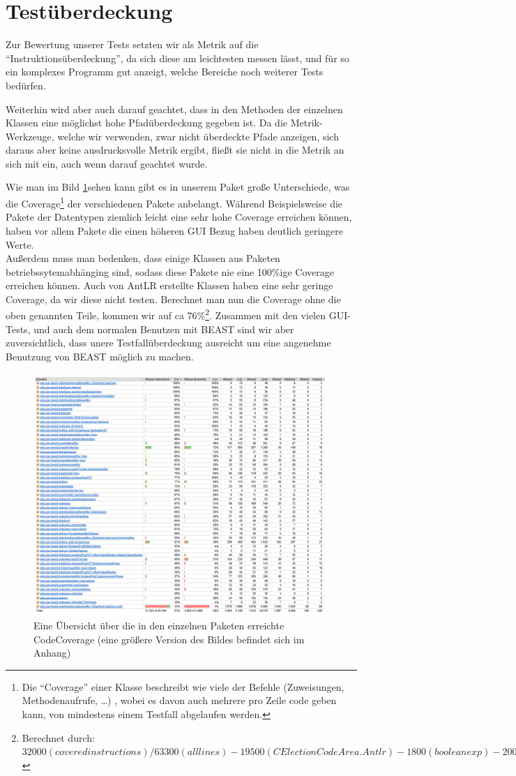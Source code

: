 \documentclass[a4paper]{scrreprt}
\begin{document}
\section{Testüberdeckung}
Zur Bewertung unserer Tests setzten wir als Metrik auf die
"`Instruktionsüberdeckung"', da sich diese am leichtesten messen lässt, und für
so ein komplexes Programm gut anzeigt, welche Bereiche noch weiterer Tests
bedürfen.

Weiterhin wird aber auch darauf geachtet, dass in den Methoden der einzelnen Klassen eine möglichst hohe
Pfadüberdeckung gegeben ist. Da die Metrik-Werkzeuge, welche wir verwenden, zwar
nicht überdeckte Pfade anzeigen, sich daraus aber keine ausdrucksvolle Metrik ergibt, fließt sie nicht in die Metrik an sich mit ein, auch wenn darauf
geachtet wurde.
\newline

Wie man im Bild \ref{coverage}sehen kann gibt es in unserem Paket große
Unterschiede, was die Coverage\footnote{Die "`Coverage"' einer Klasse beschreibt
wie viele der Befehle (Zuweisungen, Methodenaufrufe, \ldots )
, wobei es davon auch mehrere pro Zeile code geben kann, von mindestens einem
Testfall abgelaufen werden.} der verschiedenen Pakete anbelangt.
Während Beispielsweise die Pakete der Datentypen ziemlich leicht eine sehr hohe Coverage
erreichen können, haben vor allem Pakete die einen höheren GUI Bezug haben
deutlich geringere Werte. \\
Außerdem muss man bedenken, dass einige Klassen aus Paketen
betriebssytemabhänging sind, sodass diese Pakete nie eine 100\%ige Coverage
erreichen können. Auch von AntLR erstellte Klassen haben eine sehr geringe
Coverage, da wir diese nicht testen.
\newline
Berechnet man nun die Coverage ohne die oben genannten Teile, kommen wir auf ca
76\%\footnote{Berechnet durch: $32000 (covered instructions) / 63300 (all
lines) - 19500 (CElectionCodeArea.Antlr) - 1800 (booleanexp) - 200
(LinuxProcess)$}.
Zusammen mit den vielen GUI-Tests, und auch dem normalen Benutzen mit BEAST sind
wir aber zuversichtlich, dass unere Testfallüberdeckung ausreicht um eine
angenehme Benutzung von BEAST möglich zu machen.

\begin{figure}[ht]
	\centering
  \includegraphics[width=1.0\textwidth,
  height=0.40\textwidth]{images/Coverage.png} \caption{Eine Übersicht über die
  in den einzelnen Paketen erreichte CodeCoverage (eine größere Version des
  Bildes befindet sich im Anhang)}
	\label{coverage}
\end{figure}
\end{document}
